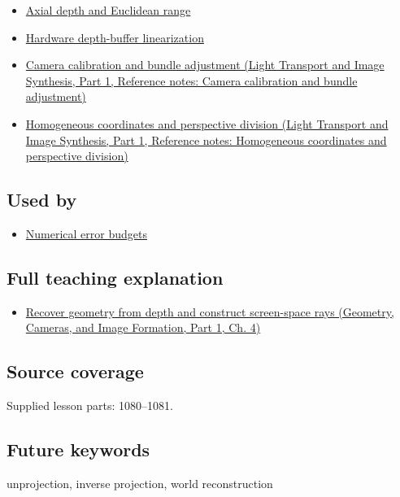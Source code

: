 \begin{itemize}
\tightlist
\item
  \hyperref[appendix-cac01ebeeb11]{Axial depth and Euclidean range}
\item
  \hyperref[appendix-1bc40b08db4a]{Hardware depth-buffer linearization}
\item
  \href{../04-Light-Transport-and-Image-Synthesis-P01/main.pdf\#nameddest=appendix-3ee9861904d5}{Camera calibration and bundle adjustment (Light Transport and Image Synthesis, Part 1, Reference notes: Camera calibration and bundle adjustment)}
\item
  \href{../04-Light-Transport-and-Image-Synthesis-P01/main.pdf\#nameddest=appendix-cb3b26862282}{Homogeneous coordinates and perspective division (Light Transport and Image Synthesis, Part 1, Reference notes: Homogeneous coordinates and perspective division)}
\end{itemize}

\subsection{Used by}\label{appendix-2cbf2968e866-used-by}

\hypertarget{appendix-2cbf2968e866-used-by}{}

\begin{itemize}
\tightlist
\item
  \hyperref[appendix-31b8c295e05f]{Numerical error budgets}
\end{itemize}

\subsection{Full teaching explanation}\label{appendix-2cbf2968e866-full-teaching-explanation}

\hypertarget{appendix-2cbf2968e866-full-teaching-explanation}{}

\begin{itemize}
\tightlist
\item
  \href{../03-Geometry-Cameras-and-Image-Formation-P01/main.pdf\#nameddest=02-foundations-ii-ch035-recover-geometry-from-depth-and-construct-screen-space-rays}{Recover geometry from depth and construct screen-space rays (Geometry, Cameras, and Image Formation, Part 1, Ch. 4)}
\end{itemize}

\subsection{Source coverage}\label{appendix-2cbf2968e866-source-coverage}

\hypertarget{appendix-2cbf2968e866-source-coverage}{}

Supplied lesson parts: 1080--1081.

\subsection{Future keywords}\label{appendix-2cbf2968e866-future-keywords}

\hypertarget{appendix-2cbf2968e866-future-keywords}{}

unprojection, inverse projection, world reconstruction
